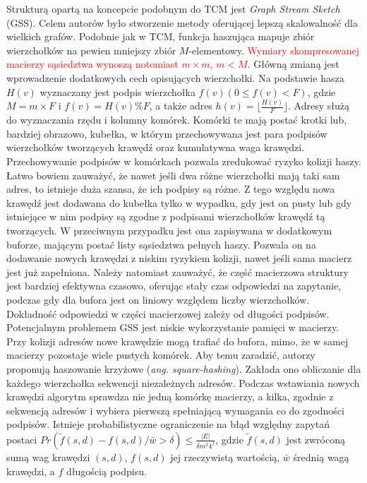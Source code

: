     Strukturą opartą na koncepcie podobnym do TCM jest \emph{Graph Stream Sketch} (GSS)\cite{Gou_Zou_Zhao_Yang_2019}. Celem autorów było stworzenie metody oferującej lepszą skalowalność dla wielkich grafów. Podobnie jak w TCM, funkcja haszująca mapuje zbiór wierzchołków na pewien mniejszy zbiór $M$-elementowy. \textcolor{red}{Wymiary skompresowanej macierzy sąsiedztwa wynoszą notomiast $m \times m$, $m < M$}. Główną zmianą jest wprowadzenie dodatkowych cech opisujących wierzchołki. Na podstawie hasza $H(v)$ wyznaczany jest  podpis wierzchołka $f(v) (0 \leq f(v) < F)$, gdzie $M = m \times F$ i $f(v) = H(v)\%F$, a także adres $h(v) = \lfloor \frac{H(v)}{F} \rfloor$. Adresy służą do wyznaczania rzędu i kolumny komórek. Komórki te mają postać krotki lub, bardziej obrazowo, kubełka, w którym przechowywana jest para podpisów wierzchołków tworzących krawędź oraz kumulatywna waga krawędzi. Przechowywanie podpisów w komórkach pozwala zredukować ryzyko kolizji haszy. Łatwo bowiem zauważyć, że nawet jeśli dwa różne wierzchołki mają taki sam adres, to istnieje duża szansa, że ich podpisy są różne. Z tego względu nowa krawędź jest dodawana do kubełka tylko w wypadku, gdy jest on pusty lub gdy istniejące w nim podpisy są zgodne z podpisami wierzchołków krawędź tą tworzących. W przeciwnym przypadku jest ona zapisywana w dodatkowym buforze, mającym postać listy sąsiedztwa pełnych haszy. Pozwala on na dodawanie nowych krawędzi z niskim ryzykiem kolizji, nawet jeśli sama macierz jest już zapełniona. Należy natomiast zauważyć, że część macierzowa struktury jest bardziej efektywna czasowo, oferując stały czas odpowiedzi na zapytanie, podczas gdy dla bufora jest on liniowy względem liczby wierzchołków. Dokładność odpowiedzi w części macierzowej zależy od długości podpisów. Potencjalnym problemem GSS jest niskie wykorzystanie pamięci w macierzy. Przy kolizji adresów nowe krawędzie mogą trafiać do bufora, mimo, że w samej macierzy pozostaje wiele pustych komórek. Aby temu zaradzić, autorzy proponują haszowanie krzyżowe (\emph{ang. square-hashing}). Zakłada ono obliczanie dla każdego wierzchołka sekwencji niezależnych adresów. Podczas wstawiania nowych krawędzi algorytm sprawdza nie jedną komórkę macierzy, a kilka, zgodnie z sekwencją adresów i wybiera pierwszą spełniającą wymagania co do zgodności podpisów. Istnieje probabilistyczne ograniczenie na błąd względny zapytań postaci $Pr(\tilde{f}(s,d) - f(s,d) / \bar{w} > \delta) \leq \frac{|E|}{\delta m^2 4^{f}}$, gdzie $\tilde{f}(s,d)$ jest zwróconą sumą wag krawędzi $(s,d)$, $f(s,d)$ jej rzeczywistą wartością, $\bar{w}$ średnią wagą krawędzi, a $f$ długością podpisu.

